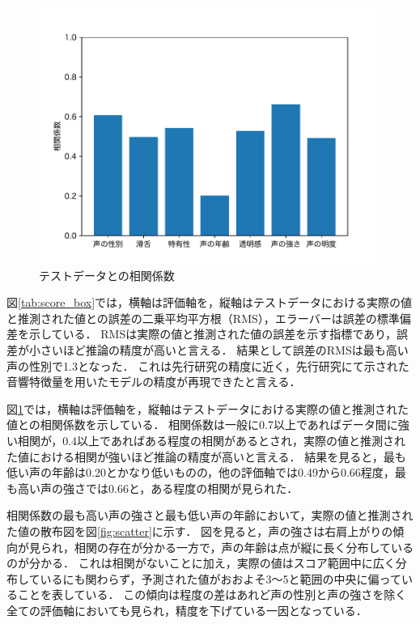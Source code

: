 \documentclass[a4j,8pt,twocolumn]{extarticle}
\begin{document}
\begin{figure}[h]
  \centering
  \includegraphics[width=\linewidth]{fig/model_quality_coor.pdf}
  \caption{テストデータとの相関係数}
  \label{tab:score_coor}
\end{figure}

図\ref{tab:score_box}では，横軸は評価軸を，縦軸はテストデータにおける実際の値と推測された値との誤差の二乗平均平方根（RMS），エラーバーは誤差の標準偏差を示している．
RMSは実際の値と推測された値の誤差を示す指標であり，誤差が小さいほど推論の精度が高いと言える．
結果として誤差のRMSは最も高い声の性別で1.3となった．
これは先行研究\cite{dnn}の精度に近く，先行研究にて示された音響特徴量を用いたモデルの精度が再現できたと言える．

図\ref{tab:score_coor}では，横軸は評価軸を，縦軸はテストデータにおける実際の値と推測された値との相関係数を示している．
相関係数は一般に0.7以上であればデータ間に強い相関が，0.4以上であればある程度の相関があるとされ，実際の値と推測された値における相関が強いほど推論の精度が高いと言える．
結果を見ると，最も低い声の年齢は0.20とかなり低いものの，他の評価軸では0.49から0.66程度，最も高い声の強さでは0.66と，ある程度の相関が見られた．

相関係数の最も高い声の強さと最も低い声の年齢において，実際の値と推測された値の散布図を図\ref{fig:scatter}に示す．
図を見ると，声の強さは右肩上がりの傾向が見られ，相関の存在が分かる一方で，声の年齢は点が縦に長く分布しているのが分かる．
これは相関がないことに加え，実際の値はスコア範囲中に広く分布しているにも関わらず，予測された値がおおよそ3〜5と範囲の中央に偏っていることを表している．
この傾向は程度の差はあれど声の性別と声の強さを除く全ての評価軸においても見られ，精度を下げている一因となっている．
\end{document}
